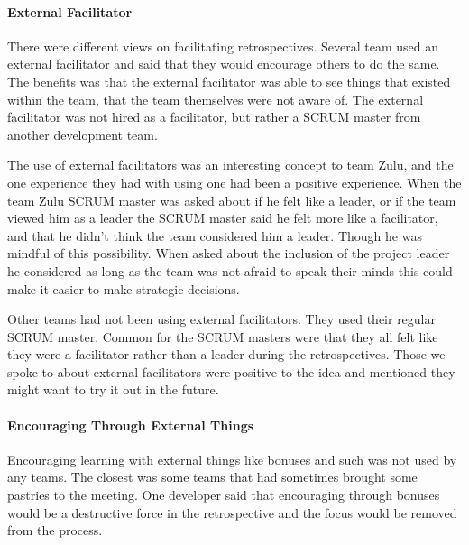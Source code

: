 \paragraph{External Facilitator}
There were different views on facilitating retrospectives. Several team used an external facilitator and said that they would encourage others to do the same. The benefits was that the external facilitator was able to see things that existed within the team, that the team themselves were not aware of. The external facilitator was not hired as a facilitator, but rather a SCRUM master from another development team.

The use of external facilitators was an interesting concept to team Zulu, and the one experience they had with using one had been a positive experience. When the team Zulu SCRUM master was asked about if he felt like a leader, or if the team viewed him as a leader the SCRUM master said he felt more like a facilitator, and that he didn't think the team considered him a leader. Though he was mindful of this possibility. When asked about the inclusion of the project leader he considered as long as the team was not afraid to speak their minds this could make it easier to make strategic decisions.

Other teams had not been using external facilitators. They used their regular SCRUM master. Common for the SCRUM masters were that they all felt like they were a facilitator rather than a leader during the retrospectives. Those we spoke to about external facilitators were positive to the idea and mentioned they might want to try it out in the future. 

\begin{table}[!h]
	\begin{center}
	\caption{Usage of external facilitator}
	\label{table:external-facilitator}
	\end{center}
\end{table}

\paragraph{Encouraging Through External Things}
\label{question-9}
Encouraging learning with external things like bonuses and such was not used by any teams. The closest was some teams that had sometimes brought some pastries to the meeting. One developer said that encouraging through bonuses would be a destructive force in the retrospective and the focus would be removed from the process.


